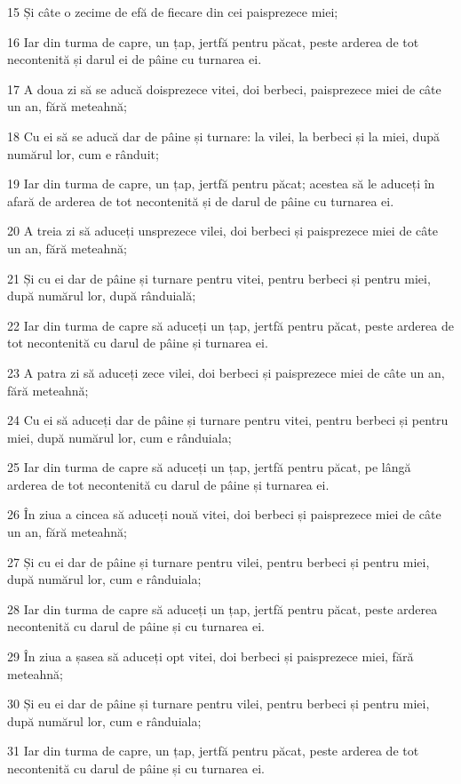 \par 15 Și câte o zecime de efă de fiecare din cei paisprezece miei;
\par 16 Iar din turma de capre, un țap, jertfă pentru păcat, peste arderea de tot necontenită și darul ei de pâine cu turnarea ei.
\par 17 A doua zi să se aducă doisprezece vitei, doi berbeci, paisprezece miei de câte un an, fără meteahnă;
\par 18 Cu ei să se aducă dar de pâine și turnare: la vilei, la berbeci și la miei, după numărul lor, cum e rânduit;
\par 19 Iar din turma de capre, un țap, jertfă pentru păcat; acestea să le aduceți în afară de arderea de tot necontenită și de darul de pâine cu turnarea ei.
\par 20 A treia zi să aduceți unsprezece vilei, doi berbeci și paisprezece miei de câte un an, fără meteahnă;
\par 21 Și cu ei dar de pâine și turnare pentru vitei, pentru berbeci și pentru miei, după numărul lor, după rânduială;
\par 22 Iar din turma de capre să aduceți un țap, jertfă pentru păcat, peste arderea de tot necontenită cu darul de pâine și turnarea ei.
\par 23 A patra zi să aduceți zece vilei, doi berbeci și paisprezece miei de câte un an, fără meteahnă;
\par 24 Cu ei să aduceți dar de pâine și turnare pentru vitei, pentru berbeci și pentru miei, după numărul lor, cum e rânduiala;
\par 25 Iar din turma de capre să aduceți un țap, jertfă pentru păcat, pe lângă arderea de tot necontenită cu darul de pâine și turnarea ei.
\par 26 În ziua a cincea să aduceți nouă vitei, doi berbeci și paisprezece miei de câte un an, fără meteahnă;
\par 27 Și cu ei dar de pâine și turnare pentru vilei, pentru berbeci și pentru miei, după numărul lor, cum e rânduiala;
\par 28 Iar din turma de capre să aduceți un țap, jertfă pentru păcat, peste arderea necontenită cu darul de pâine și cu turnarea ei.
\par 29 În ziua a șasea să aduceți opt vitei, doi berbeci și paisprezece miei, fără meteahnă;
\par 30 Și eu ei dar de pâine și turnare pentru vilei, pentru berbeci și pentru miei, după numărul lor, cum e rânduiala;
\par 31 Iar din turma de capre, un țap, jertfă pentru păcat, peste arderea de tot necontenită cu darul de pâine și cu turnarea ei.
